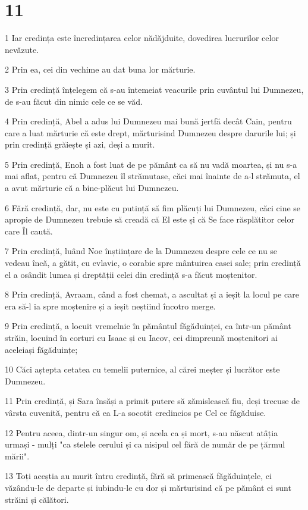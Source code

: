 \chapter{11}

\par 1 Iar credința este încredințarea celor nădăjduite, dovedirea lucrurilor celor nevăzute.
\par 2 Prin ea, cei din vechime au dat buna lor mărturie.
\par 3 Prin credință înțelegem că s-au întemeiat veacurile prin cuvântul lui Dumnezeu, de s-au făcut din nimic cele ce se văd.
\par 4 Prin credință, Abel a adus lui Dumnezeu mai bună jertfă decât Cain, pentru care a luat mărturie că este drept, mărturisind Dumnezeu despre darurile lui; și prin credință grăiește și azi, deși a murit.
\par 5 Prin credință, Enoh a fost luat de pe pământ ca să nu vadă moartea, și nu s-a mai aflat, pentru că Dumnezeu îl strămutase, căci mai înainte de a-l strămuta, el a avut mărturie că a bine-plăcut lui Dumnezeu.
\par 6 Fără credință, dar, nu este cu putință să fim plăcuți lui Dumnezeu, căci cine se apropie de Dumnezeu trebuie să creadă că El este și că Se face răsplătitor celor care Îl caută.
\par 7 Prin credință, luând Noe înștiințare de la Dumnezeu despre cele ce nu se vedeau încă, a gătit, cu evlavie, o corabie spre mântuirea casei sale; prin credință el a osândit lumea și dreptății celei din credință s-a făcut moștenitor.
\par 8 Prin credință, Avraam, când a fost chemat, a ascultat și a ieșit la locul pe care era să-l ia spre moștenire și a ieșit neștiind încotro merge.
\par 9 Prin credință, a locuit vremelnic în pământul făgăduinței, ca într-un pământ străin, locuind în corturi cu Isaac și cu Iacov, cei dimpreună moștenitori ai aceleiași făgăduințe;
\par 10 Căci aștepta cetatea cu temelii puternice, al cărei meșter și lucrător este Dumnezeu.
\par 11 Prin credință, și Sara însăși a primit putere să zămislească fiu, deși trecuse de vârsta cuvenită, pentru că ea L-a socotit credincios pe Cel ce făgăduise.
\par 12 Pentru aceea, dintr-un singur om, și acela ca și mort, s-au născut atâția urmași - mulți "ca stelele cerului și ca nisipul cel fără de număr de pe țărmul mării".
\par 13 Toți aceștia au murit întru credință, fără să primească făgăduințele, ci văzându-le de departe și iubindu-le cu dor și mărturisind că pe pământ ei sunt străini și călători.
